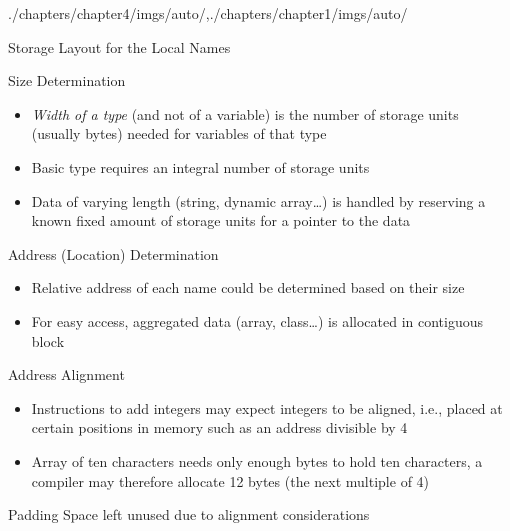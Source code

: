 \begin{graphicspathcontext}{{./chapters/chapter4/imgs/auto/},{./chapters/chapter1/imgs/auto/}}
\begin{bibunit}[apalike]
\begin{frame}{{Storage Layout} for the Local Names}
	\begin{footnotesize}
		\begin{block}{Size Determination}
			\begin{itemize}
				\item \emph{Width of a type} (and not of a variable) is the number of storage units (usually bytes) needed for variables of that type
				\item Basic type requires an integral number of storage units
				\item Data of varying length (string, dynamic array\dots) is handled by reserving a known fixed amount of storage units for a pointer to the data
			\end{itemize}
		\end{block}
		\begin{block}{Address (Location) Determination }
			\begin{itemize}
				\item Relative address of each name could be determined based on their size
				\item For easy access, aggregated data (array, class\dots) is allocated in contiguous block
			\end{itemize}
		\end{block}
	\end{footnotesize}
\end{frame}

\begin{frame}[t]{Address Alignment}
	\begin{small}
		\begin{examples}
			\begin{itemize}
			\item Instructions to add integers may expect integers to be aligned, i.e., placed at certain positions in memory such as an address divisible by 4
			\item Array of ten characters needs only enough bytes to hold ten characters, a compiler may therefore allocate 12 bytes (the next multiple of 4)
			\end{itemize}
		\end{examples}
		\begin{definitionblock}{Padding}
			Space left unused due to alignment considerations
		\end{definitionblock}
	\end{small}
\end{frame}


\end{bibunit}
\end{graphicspathcontext}
